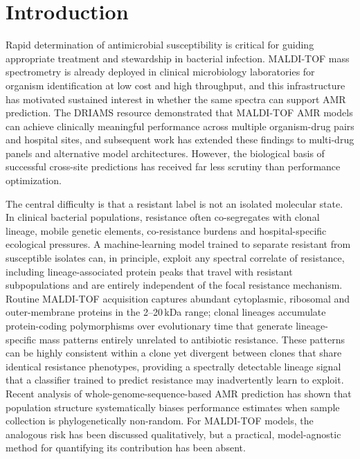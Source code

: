 \documentclass[11pt]{article}
\begin{document}
\section*{Introduction}

Rapid determination of antimicrobial susceptibility is critical for guiding appropriate treatment and stewardship in bacterial infection. MALDI-TOF mass spectrometry is already deployed in clinical microbiology laboratories for organism identification at low cost and high throughput, and this infrastructure has motivated sustained interest in whether the same spectra can support AMR prediction. The DRIAMS resource demonstrated that MALDI-TOF AMR models can achieve clinically meaningful performance across multiple organism-drug pairs and hospital sites\cite{weis2022driams,driamsdryad}, and subsequent work has extended these findings to multi-drug panels and alternative model architectures. However, the biological basis of successful cross-site predictions has received far less scrutiny than performance optimization.

The central difficulty is that a resistant label is not an isolated molecular state. In clinical bacterial populations, resistance often co-segregates with clonal lineage, mobile genetic elements, co-resistance burdens and hospital-specific ecological pressures. A machine-learning model trained to separate resistant from susceptible isolates can, in principle, exploit any spectral correlate of resistance, including lineage-associated protein peaks that travel with resistant subpopulations and are entirely independent of the focal resistance mechanism. Routine MALDI-TOF acquisition captures abundant cytoplasmic, ribosomal and outer-membrane proteins in the 2--20\,kDa range; clonal lineages accumulate protein-coding polymorphisms over evolutionary time that generate lineage-specific mass patterns entirely unrelated to antibiotic resistance. These patterns can be highly consistent within a clone yet divergent between clones that share identical resistance phenotypes, providing a spectrally detectable lineage signal that a classifier trained to predict resistance may inadvertently learn to exploit. Recent analysis of whole-genome-sequence-based AMR prediction has shown that population structure systematically biases performance estimates when sample collection is phylogenetically non-random\cite{yu2025population}. For MALDI-TOF models, the analogous risk has been discussed qualitatively\cite{weis2022stratification}, but a practical, model-agnostic method for quantifying its contribution has been absent.
\end{document}
